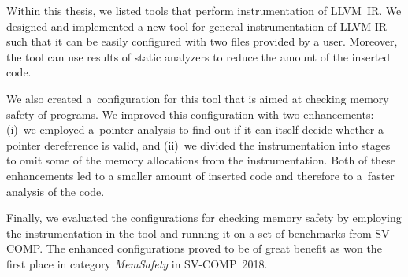 Within this thesis, we listed tools that perform instrumentation of LLVM~IR. We
designed and implemented a new tool for general instrumentation of LLVM IR such
that it can be easily configured with two files provided by a user. Moreover,
the tool can use results of static analyzers to reduce the amount of the
inserted code.

We also created a~configuration for this tool that is aimed at checking memory
safety of programs. We improved this configuration with two enhancements:
(i)~we employed a~pointer analysis to find out if it can itself decide
whether a pointer dereference is valid, and (ii)~we divided the instrumentation
into stages to omit some of the memory allocations from the instrumentation.
Both of these enhancements led to a smaller amount of inserted code and
therefore to a~faster analysis of the code.

Finally, we evaluated the configurations for checking memory safety by
employing the instrumentation in the tool \symbiotic and running it on a set of
benchmarks from SV-COMP. The enhanced configurations proved to be of great
benefit as \symbiotic won the first place in category \emph{MemSafety}
in SV-COMP~2018.
